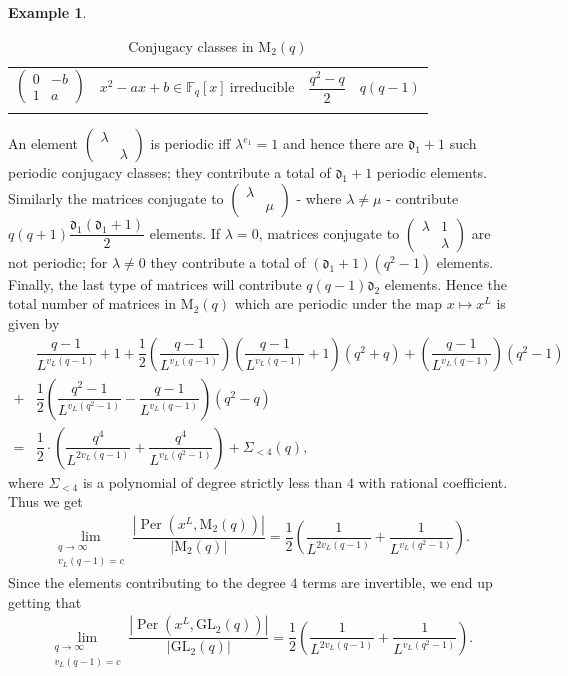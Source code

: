 \documentclass[11pt,twoside]{amsart}
\newcommand{\GL}{\mathrm{GL}}
\newcommand{\M}{\mathrm{M}}
\newcommand{\F}{\mathbb{F}}
\newcommand{\per}{\operatorname{Per}}
\renewcommand{\d}{\mathfrak d}
\theoremstyle{definition} %
\newtheorem{example}[lemma]{Example}
\begin{document}
\begin{example}
\begin{center}
\begin{longtable}{cccc}
$\begin{pmatrix}
0&-b\\
1&a
\end{pmatrix}$
&
$x^2-ax+b\in\F_q[x]\ \text{irreducible}$
&
$\dfrac{q^2-q}{2}$
&
$q(q-1)$
\\
\caption{Conjugacy classes in $\M_2(q)$}\label{tab:M2}
\end{longtable}
\end{center}
An element $\begin{pmatrix}
    \lambda & \\&\lambda
\end{pmatrix}$ is periodic iff $\lambda^{e_1}=1$ and hence there are $\d_1+1$ such periodic conjugacy classes; they contribute a total of $\d_1+1$ periodic elements.
Similarly the matrices conjugate to $\begin{pmatrix}
    \lambda &\\&\mu
\end{pmatrix}$ - where $\lambda\neq\mu$ - contribute $q(q+1)\dfrac{\d_1(\d_1+1)}{2}$ elements.
If $\lambda=0$, matrices conjugate to $\begin{pmatrix}
    \lambda&1\\&\lambda
\end{pmatrix}$ are not periodic; for $\lambda\neq 0$ they contribute a total of $(\d_1+1)(q^2-1)$ elements.
Finally, the last type of matrices will contribute $q(q-1)\d_2$ elements. 
Hence the total number of matrices in $\M_2(q)$ which are periodic under the map $x\mapsto x^L$ is given by
\begin{align*}
    &\dfrac{q-1}{L^{v_L(q-1)}}+1+\dfrac{1}{2}\left(\dfrac{q-1}{L^{v_L(q-1)}}\right)\left(\dfrac{q-1}{L^{v_L(q-1)}}+1\right)(q^2+q)+\left(\dfrac{q-1}{L^{v_L(q-1)}}\right)(q^2-1)\\
    +&\dfrac{1}{2}\left(\dfrac{q^2-1}{L^{v_L(q^2-1)}}-\dfrac{q-1}{L^{v_L(q-1)}}\right)(q^2-q)\\
    =&\dfrac{1}{2}\cdot \left(\dfrac{q^4}{L^{2v_L(q-1)}}+\dfrac{q^4}{L^{v_L(q^2-1)}}\right)+ \Sigma_{<4}(q),
\end{align*}
where $\Sigma_{<4}$ is a polynomial of degree strictly less than $4$ with rational coefficient.
Thus we get
\begin{align*}
          \lim\limits_{\substack{q\longrightarrow \infty\\v_L(q-1)=c}}\dfrac{\left|\per(x^L,\M_2(q))\right|}{|\M_2(q)|}=\dfrac{1}{2}\left(\dfrac{1}{L^{2v_L(q-1)}}+\dfrac{1}{L^{v_L(q^2-1)}}\right).
\end{align*}
Since the elements contributing to the degree $4$ terms are invertible, we end up getting that
\begin{align*}
          \lim\limits_{\substack{q\longrightarrow \infty\\v_L(q-1)=c}}\dfrac{\left|\per(x^L,\GL_2(q))\right|}{|\GL_2(q)|}=\dfrac{1}{2}\left(\dfrac{1}{L^{2v_L(q-1)}}+\dfrac{1}{L^{v_L(q^2-1)}}\right).
\end{align*}
\end{example}
\end{document}
